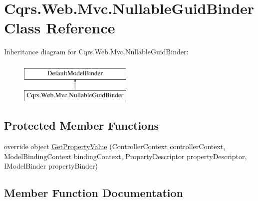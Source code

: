 \hypertarget{classCqrs_1_1Web_1_1Mvc_1_1NullableGuidBinder}{}\section{Cqrs.\+Web.\+Mvc.\+Nullable\+Guid\+Binder Class Reference}
\label{classCqrs_1_1Web_1_1Mvc_1_1NullableGuidBinder}
Inheritance diagram for Cqrs.\+Web.\+Mvc.\+Nullable\+Guid\+Binder\+:\begin{figure}[H]
\begin{center}
\leavevmode
\includegraphics[height=2.000000cm]{classCqrs_1_1Web_1_1Mvc_1_1NullableGuidBinder}
\end{center}
\end{figure}
\subsection*{Protected Member Functions}
\begin{DoxyCompactItemize}
\item 
override object \hyperlink{classCqrs_1_1Web_1_1Mvc_1_1NullableGuidBinder_ab6dc97f55bdf6a968449f365a807da0a}{Get\+Property\+Value} (Controller\+Context controller\+Context, Model\+Binding\+Context binding\+Context, Property\+Descriptor property\+Descriptor, I\+Model\+Binder property\+Binder)
\end{DoxyCompactItemize}


\subsection{Member Function Documentation}
\mbox{\label{classCqrs_1_1Web_1_1Mvc_1_1NullableGuidBinder_ab6dc97f55bdf6a968449f365a807da0a}} 
